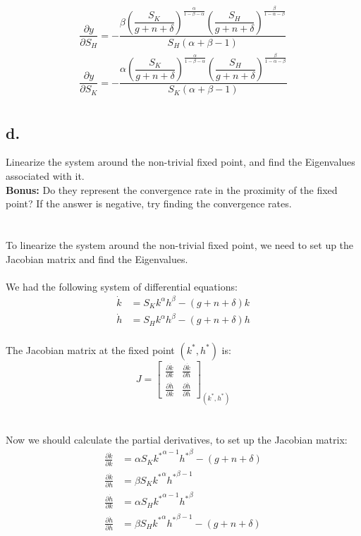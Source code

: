 \documentclass[12pt]{extarticle}
\def\secondarycolor{Golden}
\newcommand{\problem}[1]{
    \subsection*{\textcolor{\secondarycolor}{#1}}
    \addcontentsline{toc}{subsection}{\protect\numberline{}#1}
}
\begin{document}
\begin{align*}
    \dfrac{\partial y}{\partial S_H}=-\dfrac{\beta(\dfrac{S_K}{g+n+\delta})^{\frac{\alpha}{1-\beta-\alpha}}(\dfrac{{S_H}}{g+n+\delta})^{\frac{\beta}{1-\alpha-\beta}}}{S_H(\alpha+\beta-1)}\\
    \dfrac{\partial y}{\partial S_K}=-\dfrac{\alpha(\dfrac{S_K}{g+n+\delta})^{\frac{\alpha}{1-\beta-\alpha}}(\dfrac{{S_H}}{g+n+\delta})^{\frac{\beta}{1-\alpha-\beta}}}{S_K(\alpha+\beta-1)}\\
\end{align*}
\newpage
\problem{d.}Linearize the system around the non-trivial fixed point, and find the Eigenvalues associated with it.\\
\textbf{Bonus:} Do they represent the convergence rate in the proximity of the fixed point? If the answer is
negative, try finding the convergence rates.\\\\\\
To linearize the system around the non-trivial fixed point,
we need to set up the Jacobian matrix and find the Eigenvalues.\\\\
We had the following system of differential equations:
\begin{align*}
    \dot{k} &= S_K k^\alpha h^\beta - (g + n + \delta)k \\
    \dot{h} &= S_H k^\alpha h^\beta - (g + n + \delta)h
\end{align*}\\
The Jacobian matrix at the fixed point $(k^*, h^*)$ is:
$$J = \begin{bmatrix}
    \frac{\partial \dot{k}}{\partial k} & \frac{\partial \dot{k}}{\partial h} \\
    \frac{\partial \dot{h}}{\partial k} & \frac{\partial \dot{h}}{\partial h}
\end{bmatrix}_{(k^*, h^*)}$$\\\\
Now we should calculate the partial derivatives, to set up the Jacobian matrix:\\
\begin{align*}
    \frac{\partial \dot{k}}{\partial k} &= \alpha S_K {k^*}^{\alpha-1} {h^*}^\beta - (g + n + \delta) \\
    \frac{\partial \dot{k}}{\partial h} &= \beta S_K {k^*}^\alpha {h^*}^{\beta-1} \\
    \frac{\partial \dot{h}}{\partial k} &= \alpha S_H {k^*}^{\alpha-1} {h^*}^\beta \\
    \frac{\partial \dot{h}}{\partial h} &= \beta S_H {k^*}^\alpha {h^*}^{\beta-1} - (g + n + \delta)
\end{align*}
\end{document}
